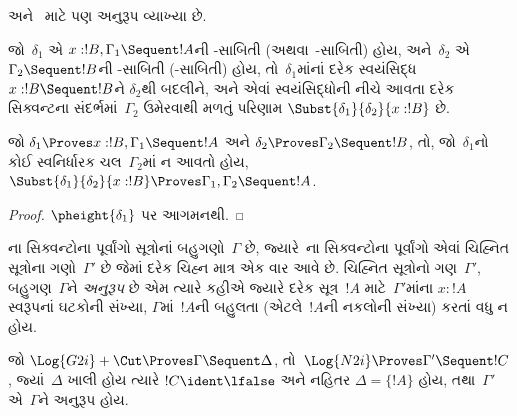  અને~
માટે પણ અનુરૂપ વ્યાખ્યા છે.

\begin{defn}
જો~$\delta_1$ એ
$x:!B, \Gamma_1 \Sequent !A$ની
-સાબિતી
(અથવા~-સાબિતી)
હોય, અને~$\delta_2$ એ
$\Gamma_2 \Sequent !B$ની
-સાબિતી
(-સાબિતી) હોય,
તો~$\delta_1$માંનાં
દરેક સ્વયંસિદ્ધ
$x:!B \Sequent !B$ને
$\delta_2$થી બદલીને,
અને એવાં સ્વયંસિદ્ધોની
નીચે આવતા દરેક સિક્વન્ટના
સંદર્ભમાં~$\Gamma_2$ ઉમેરવાથી
મળતું પરિણામ
$\Subst{\delta_1}{\delta_2}{x:!B}$
છે.
\end{defn}

\begin{prop}
જો $\delta_1 \Proves x:!B, \Gamma_1 \Sequent
!A$ અને $\delta_2 \Proves \Gamma_2 \Sequent !B$,
તો, જો~$\delta_1$નો કોઈ
સ્વનિર્ધારક ચલ~$\Gamma_2$માં
ન આવતો હોય,
$\Subst{\delta_1}{\delta_2}{x:!B} \Proves \Gamma_1, \Gamma_2 \Sequent
!A$.
\end{prop}


\begin{proof}
  $\pheight{\delta_1}$ પર આગમનથી.
\end{proof}
\endgroup

\begingroup
\makeatletter{}\makeatother


\label{guunit:OLP-0670}


ના સિક્વન્ટોના
પૂર્વાંગો સૂત્રોનાં
બહુગણો~$\Gamma$ છે,
જ્યારે~ના
સિક્વન્ટોના પૂર્વાંગો
એવાં ચિહ્નિત સૂત્રોના
ગણો~$\Gamma'$ છે
જેમાં દરેક ચિહ્ન માત્ર
એક વાર આવે છે.
ચિહ્નિત સૂત્રોનો
ગણ~$\Gamma'$,
બહુગણ~$\Gamma$ને
\emph{અનુરૂપ} છે એમ
ત્યારે કહીએ જ્યારે
દરેક સૂત્ર~$!A$
માટે~$\Gamma'$માંના
$x : !A$ સ્વરૂપનાં
ઘટકોની સંખ્યા,
$\Gamma$માં~$!A$ની
બહુલતા (એટલે~$!A$ની
નકલોની સંખ્યા)
કરતાં વધુ ન હોય.

\begin{prop}
જો $\Log{G2i} + \Cut \Proves \Gamma \Sequent \Delta$,
તો~$\Log{N2i}
\Proves \Gamma' \Sequent !C$,
જ્યાં~$\Delta$ ખાલી
હોય ત્યારે
$!C \ident \lfalse$
અને નહિતર
$\Delta = \{!A\}$ હોય,
તથા~$\Gamma'$ એ~$\Gamma$ને
અનુરૂપ હોય.
\end{prop}


